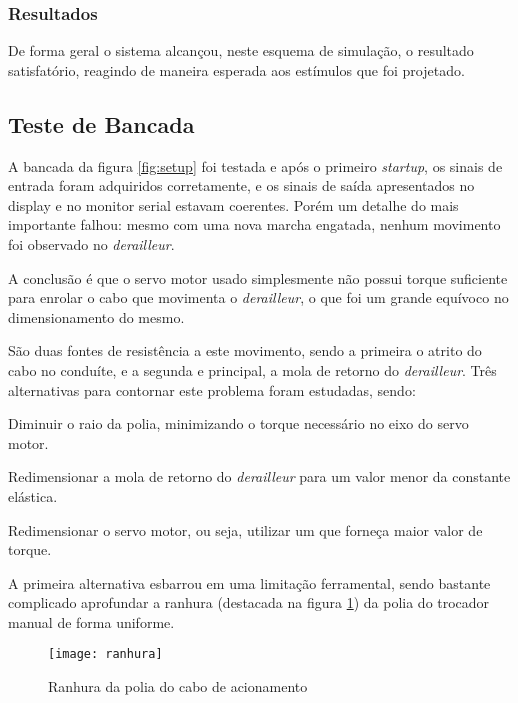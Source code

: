 \documentclass[a4paper,11pt]{article}
\begin{document}
\subsubsection{Resultados}

De forma geral o sistema alcançou, neste esquema de simulação, o resultado
satisfatório, reagindo de maneira esperada aos estímulos que foi projetado.


\subsection{Teste de Bancada}

A bancada da figura \ref{fig:setup} foi testada e após o primeiro
\textit{startup}, os sinais de entrada foram adquiridos corretamente, e os
sinais de saída apresentados no display e no monitor serial estavam coerentes.
Porém um detalhe do mais importante falhou: mesmo com uma nova marcha engatada,
nenhum movimento foi observado no \textit{derailleur}.

A conclusão é que o servo motor usado simplesmente não possui torque suficiente
para enrolar o cabo que movimenta o \textit{derailleur}, o que foi um grande
equívoco no dimensionamento do mesmo.

São duas fontes de resistência a este movimento, sendo a primeira o atrito do
cabo no conduíte, e a segunda e principal, a mola de retorno do
\textit{derailleur}. Três alternativas para contornar este problema foram
estudadas, sendo:
\begin{enumerate*}
  \item Diminuir o raio da polia, minimizando o torque necessário no eixo do
servo motor.
  \item Redimensionar a mola de retorno do \textit{derailleur} para um valor
menor da constante elástica.
  \item Redimensionar o servo motor, ou seja, utilizar um que forneça maior
valor de torque.
\end{enumerate*}

A primeira alternativa esbarrou em uma limitação ferramental, sendo bastante
complicado aprofundar a ranhura (destacada na figura \ref{fig:ranhura}) da polia
do trocador manual de forma uniforme.
\begin{figure}[!h]
\begin{center}
  \texttt{[image: ranhura]}
\end{center}
  \caption{Ranhura da polia do cabo de acionamento}
  \label{fig:ranhura}
\end{figure}
\end{document}
